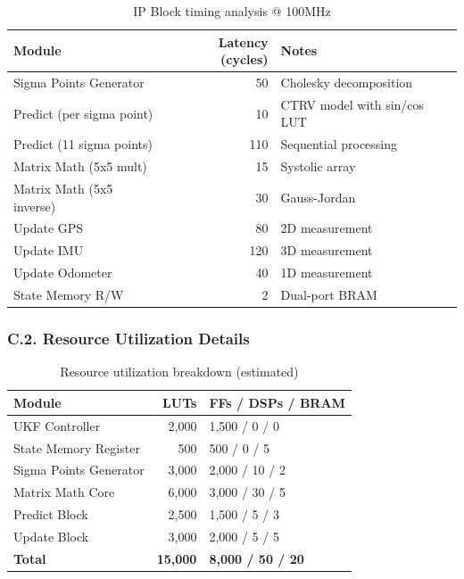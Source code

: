 \begin{table}[H]
\centering
\begin{tabular}{|l|r|l|}
\hline
\textbf{Module} & \textbf{Latency (cycles)} & \textbf{Notes} \\
\hline
Sigma Points Generator & 50 & Cholesky decomposition \\
\hline
Predict (per sigma point) & 10 & CTRV model with sin/cos LUT \\
\hline
Predict (11 sigma points) & 110 & Sequential processing \\
\hline
Matrix Math (5x5 mult) & 15 & Systolic array \\
\hline
Matrix Math (5x5 inverse) & 30 & Gauss-Jordan \\
\hline
Update GPS & 80 & 2D measurement \\
\hline
Update IMU & 120 & 3D measurement \\
\hline
Update Odometer & 40 & 1D measurement \\
\hline
State Memory R/W & 2 & Dual-port BRAM \\
\hline
\end{tabular}
\caption{IP Block timing analysis @ 100MHz}
\end{table}

\subsubsection*{C.2. Resource Utilization Details}

\begin{table}[H]
\centering
\begin{tabular}{|l|r|l|}
\hline
\textbf{Module} & \textbf{LUTs} & \textbf{FFs / DSPs / BRAM} \\
\hline
UKF Controller & 2,000 & 1,500 / 0 / 0 \\
\hline
State Memory Register & 500 & 500 / 0 / 5 \\
\hline
Sigma Points Generator & 3,000 & 2,000 / 10 / 2 \\
\hline
Matrix Math Core & 6,000 & 3,000 / 30 / 5 \\
\hline
Predict Block & 2,500 & 1,500 / 5 / 3 \\
\hline
Update Block & 3,000 & 2,000 / 5 / 5 \\
\hline
\textbf{Total} & \textbf{15,000} & \textbf{8,000 / 50 / 20} \\
\hline
\end{tabular}
\caption{Resource utilization breakdown (estimated)}
\end{table}


